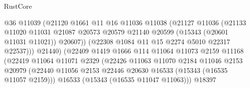\begin{lexlean}{RustCore}
\begin{coremodule}
                                        @36
                                        @11039
                                        (@21120
                                          @1661
                                          @11
                                          @16
                                          @11036
                                          @11038
                                          (@21127
                                            @11036
                                            (@21133
                                              @11020
                                              @11031
                                              @21087
                                              @20573
                                              @20579
                                              @21140
                                              @20599
                                              (@15343 (@20601 @11031 @11021))
                                              @20607))
                                          (@22308 @1084 @11 @15 @2274 @5010 @22317 @22537)))
                                      @21440)
                                    (@22409
                                      @1419
                                      @1666
                                      @114
                                      @11064
                                      @11073
                                      @2159
                                      @11168
                                      (@22419
                                        @11064
                                        @11071
                                        @2329
                                        (@22426
                                          @11063
                                          @11070
                                          @2184
                                          @11046
                                          @2153
                                          @20979
                                          (@22440
                                            @11056
                                            @2153
                                            @22446
                                            @20630
                                            @16533
                                            (@15343 (@16535 @11057 @2159)))
                                          @16533
                                          (@15343 (@16535 @11047 @11063)))
                                        @18397

\end{coremodule}
\end{lexlean}
